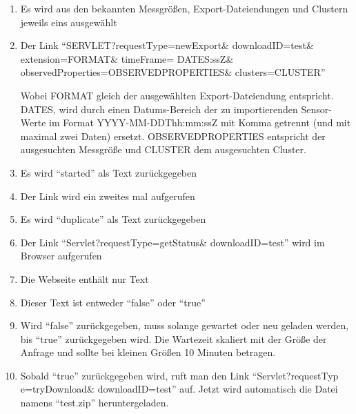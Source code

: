\begin{enumerate}
\item Es wird aus den bekannten Messgrößen, Export-Dateiendungen und Clustern jeweils eins ausgewählt
\item Der Link ``SERVLET?requestType=newExport\& downloadID=test\& extension=FORMAT\& timeFrame= DATES:ssZ\& observedProperties=\newline OBSERVEDPROPERTIES\& clusters=CLUSTER''
\par
Wobei FORMAT gleich der ausgewählten Export-Dateiendung entspricht. DATES, wird durch einen Datums-Bereich der zu importierenden Sensor-Werte im Format YYYY-MM-DDThh:mm:ssZ mit Komma getrennt (und mit maximal zwei Daten) ersetzt. OBSERVEDPROPERTIES entspricht der ausgesuchten Messgröße und CLUSTER dem ausgesuchten Cluster.
\item Es wird ``started'' als Text zurückgegeben
\item Der Link wird ein zweites mal aufgerufen
\item Es wird ``duplicate'' als Text zurückgegeben
\item Der Link ``Servlet?requestType=getStatus\& downloadID=test'' wird im Browser aufgerufen
\item Die Webseite enthält nur Text
\item Dieser Text ist entweder ``false'' oder ``true''
\item Wird ``false'' zurückgegeben, muss solange gewartet oder neu geladen werden, bis ``true'' zurückgegeben wird. 
\newline
Die Wartezeit skaliert mit der Größe der Anfrage und sollte bei kleinen Größen 10 Minuten betragen.
\item Sobald ``true'' zurückgegeben wird, ruft man den Link ``Servlet?requestTyp e=tryDownload\& downloadID=test'' auf. Jetzt wird automatisch die Datei namens ``test.zip'' heruntergeladen.
\end{enumerate}
\szenarioGood